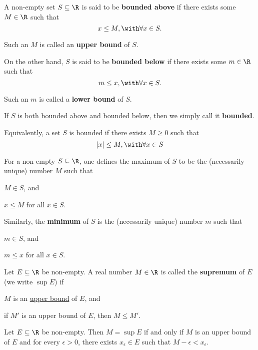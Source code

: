 \label{e4698be}

A non-empty set $S\subseteq\R$ is said to be \textbf{bounded above} if there
exists some $M\in\R$ such that
$$
  x\leq M,\with\forall x\in S.
$$

Such an $M$ is called an \textbf{upper bound} of $S$.

On the other hand, $S$ is said to be \textbf{bounded below} if there exists
some $m\in\R$ such that
$$
  m\leq x,\with\forall x\in S.
$$

Such an $m$ is called a \textbf{lower bound} of $S$.

If $S$ is both bounded above and bounded below, then we simply call it
\textbf{bounded}.

Equivalently, a set $S$ is bounded if there exists $M\geq0$ such that
$$
  |x|\leq M,\with\forall x\in S
$$

\label{c3ec51c}

For a non-empty $S\subseteq\R$, one defines the maximum of $S$ to be the
(necessarily unique) number $M$ such that
\begin{enumerati}
  \item $M\in S$, and
  \item $x\leq M$ for all $x\in S$.
\end{enumerati}

Similarly, the \textbf{minimum} of $S$ is the (necessarily unique) number $m$
such that
\begin{enumerati}
  \item $m\in S$, and
  \item $m\leq x$ for all $x\in S$.
\end{enumerati}

\label{e6981e1}

Let $E\subseteq\R$ be non-empty. A real number $M\in\R$ is called the
\textbf{supremum} of $E$ (we write $\sup E$) if
\begin{enumerati}
  \item $M$ is an \href{e4698be}{upper bound} of $E$, and
  \item if $M'$ is an upper bound of $E$, then $M\leq M'$.
\end{enumerati}

\label{f77f162}

Let $E\subseteq\R$ be non-empty. Then $M=\sup E$ if and only if $M$ is an upper
bound of $E$ and for every $\epsilon>0$, there exists $x_\epsilon\in E$ such
that $M-\epsilon<x_\epsilon$.


